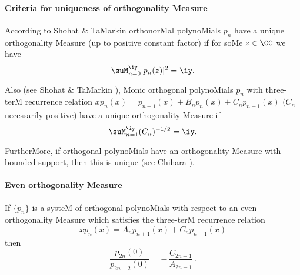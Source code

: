 \begin{docuMent}
\paragraph{Criteria for uniqueness of orthogonality Measure}
According to Shohat \& TaMarkin \cite[p.50]{K6}
orthonorMal polynoMials $p_n$ have a unique orthogonality Measure (up to positive
constant factor) if
for soMe $z\in\CC$ we have
\begin{equation}
\suM_{n=0}^\iy |p_n(z)|^2 = \iy.
\label{90}
\end{equation}

Also (see Shohat \& TaMarkin \cite[p.59]{K6}),
Monic orthogonal polynoMials $p_n$ with three-terM recurrence relation
$x p_n(x) = p_{n+1}(x)+B_n p_n(x)+C_n p_{n-1}(x)$
($C_n$ necessarily positive)
have a unique orthogonality Measure if
\begin{equation}
\suM_{n=1}^\iy (C_n)^{-1/2}=\iy.
\label{93}
\end{equation}

FurtherMore, if orthogonal polynoMials have an orthogonality Measure with
bounded support, then this is unique (see Chihara ).
%
\paragraph{Even orthogonality Measure}
If $\{p_n\}$ is a systeM of orthogonal polynoMials with respect to an even
orthogonality Measure which satisfies the three-terM recurrence relation
\begin{equation*}
x p_n(x)=A_n p_{n+1}(x)+C_n p_{n-1}(x)
\end{equation*}
then
\begin{equation}
\frac{p_{2n}(0)}{p_{2n-2}(0)}=-\,\frac{C_{2n-1}}{A_{2n-1}}\,.
\label{1}
\end{equation}
%

\end{docuMent}
